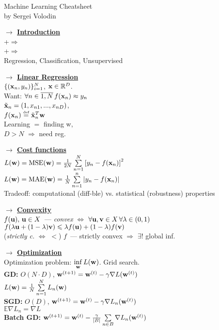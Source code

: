 \documentclass[]{article}
\newcommand{\myvector}[1]{{\bf{#1}}}
\newcommand{\x}{\myvector{x}}
\newcommand{\w}{\myvector{w}}
\newcommand{\uu}{\myvector{u}}
\newcommand{\vv}{\myvector{v}}
\newcommand{\eqdef}{\overset{\mbox{\tiny{def}}}{=}}
\newcommand{\mytitle}[1]{ {\bf $\rightarrow$ \underline{#1}}\\}
\begin{document}
\begin{center}
	{\large Machine Learning Cheatsheet}\\
	by Sergei Volodin
\end{center}
\begin{multicols*}{2}
\mytitle{Introduction}
+$\Rightarrow$\\
+$\Rightarrow$\\
Regression, Classification, Unsupervised

\mytitle{Linear Regression}
$\{(\x_n, y_n)\}_{i=1}^N$, $\x\in \mathbb{R}^D$.\\
Want: $\forall n\in\overline{1, N}\,f(\x_n)\approx y_n$\\
$\tilde{\x}_n=(1,x_{n1},...,x_{nD})$,\\
$f(\x_n)\eqdef \tilde{\x}_n^T\w$\\
Learning $=$ finding w,\\
$D>N$ $\Rightarrow$ need reg.

\mytitle{Cost functions}
$L(\w)=\mbox{MSE}(\w)=\frac{1}{2N}\sum\limits_{n=1}^N\left[y_n-f(\x_n)\right]^2$\\
$L(\w)=\mbox{MAE}(\w)=\frac{1}{N}\sum\limits_{n=1}^n\left|y_n-f(\x_n)\right|$\\

Tradeoff: computational (diff-ble) vs. statistical (robustness) properties

\mytitle{Convexity}
$f(\uu),\,\uu\in X$~--- {\em convex} $\Leftrightarrow$
$\forall \uu, \vv\in X\,\forall \lambda\in \left(0,1\right)$\\
$f(\lambda \uu + (1-\lambda) \vv)\leqslant \lambda f(\uu)+(1-\lambda)f(\vv)$\\
({\em strictly c.} $\Leftrightarrow$ $<$)
$f$~--- strictly convex $\Rightarrow$ $\exists !$ global inf.

\mytitle{Optimization}
Optimization problem:
$\inf\limits_{\w}L(\w)$. Grid search.\\
{\bf GD:} $O(N\cdot D)$, $\w^{(t+1)}=\w^{(t)}-\gamma\nabla L(\w^{(t)})$\\
$L(\w)=\frac{1}{N}\sum\limits_{n=1}^N L_n(\w)$\\
{\bf SGD:} $O(D)$, $\w^{(t+1)}=\w^{(t)}-\gamma\nabla L_n(\w^{(t)})$\\
$\mathbb{E}\nabla L_n=\nabla L$\\
{\bf Batch GD:}  $\w^{(t+1)}=\w^{(t)}-\frac{\gamma}{|B|} \sum\limits_{n\in B}\nabla L_n(\w^{(t)})$


\end{multicols*}
\end{document}
